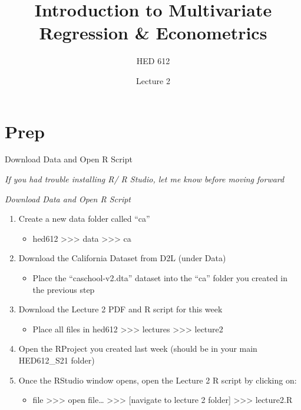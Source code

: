 \documentclass[
  8pt,
  ignorenonframetext,
  dvipsnames]{beamer}
\title{Introduction to Multivariate Regression \& Econometrics}
\subtitle{HED 612}
\author{Lecture 2}
\date{}
\providecommand{\tightlist}{%
  \setlength{\itemsep}{0pt}\setlength{\parskip}{0pt}}
\let\olditem\item
\renewcommand{\item}{%
  \olditem\vspace{4pt}
}
\begin{document}
\frame{\titlepage}

\begin{frame}
  \tableofcontents[hideallsubsections]
\end{frame}
\hypertarget{prep}{%
\section{Prep}\label{prep}}

\begin{frame}{Download Data and Open R Script}
\protect\hypertarget{download-data-and-open-r-script}{}

\emph{If you had trouble installing R/ R Studio, let me know before
moving forward}

\medskip

\emph{Download Data and Open R Script}

\begin{enumerate}
\tightlist
\item
  Create a new data folder called ``ca''

  \begin{itemize}
  \tightlist
  \item
    hed612 \textgreater\textgreater\textgreater{} data
    \textgreater\textgreater\textgreater{} ca
  \end{itemize}
\item
  Download the California Dataset from D2L (under Data)

  \begin{itemize}
  \tightlist
  \item
    Place the ``caschool-v2.dta'' dataset into the ``ca'' folder you
    created in the previous step
  \end{itemize}
\item
  Download the Lecture 2 PDF and R script for this week

  \begin{itemize}
  \tightlist
  \item
    Place all files in hed612 \textgreater\textgreater\textgreater{}
    lectures \textgreater\textgreater\textgreater{} lecture2
  \end{itemize}
\item
  Open the RProject you created last week (should be in your main
  HED612\_S21 folder)
\item
  Once the RStudio window opens, open the Lecture 2 R script by clicking
  on:

  \begin{itemize}
  \tightlist
  \item
    file \textgreater\textgreater\textgreater{} open file\ldots{}
    \textgreater\textgreater\textgreater{} {[}navigate to lecture 2
    folder{]} \textgreater\textgreater\textgreater{} lecture2.R
  \end{itemize}
\end{enumerate}

\end{frame}
\end{document}
